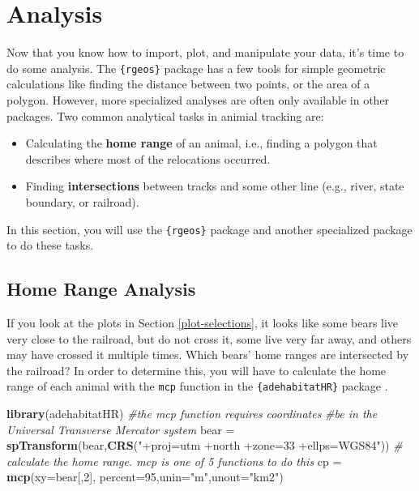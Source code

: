 \documentclass[]{book}
\newenvironment{Shaded}{\begin{snugshade}}{\end{snugshade}}
\newcommand{\KeywordTok}[1]{\textcolor[rgb]{0.13,0.29,0.53}{\textbf{#1}}}
\newcommand{\DataTypeTok}[1]{\textcolor[rgb]{0.13,0.29,0.53}{#1}}
\newcommand{\DecValTok}[1]{\textcolor[rgb]{0.00,0.00,0.81}{#1}}
\newcommand{\StringTok}[1]{\textcolor[rgb]{0.31,0.60,0.02}{#1}}
\newcommand{\CommentTok}[1]{\textcolor[rgb]{0.56,0.35,0.01}{\textit{#1}}}
\newcommand{\NormalTok}[1]{#1}
\providecommand{\tightlist}{%
  \setlength{\itemsep}{0pt}\setlength{\parskip}{0pt}}
\theoremstyle{definition}
\theoremstyle{definition}
\theoremstyle{definition}
\theoremstyle{remark}
\begin{document}
\section{Analysis}\label{Anal}

Now that you know how to import, plot, and manipulate your data, it's
time to do some analysis. The \texttt{\{rgeos\}} package \citep{R-rgeos}
has a few tools for simple geometric calculations like finding the
distance between two points, or the area of a polygon. However, more
specialized analyses are often only available in other packages. Two
common analytical tasks in animial tracking are:

\begin{itemize}
\tightlist
\item
  Calculating the \textbf{home range} of an animal, i.e., finding a
  polygon that describes where most of the relocations occurred.
\item
  Finding \textbf{intersections} between tracks and some other line
  (e.g., river, state boundary, or railroad).
\end{itemize}

In this section, you will use the \texttt{\{rgeos\}} package and another
specialized package to do these tasks.

\subsection{Home Range Analysis}\label{hr-Anal}

If you look at the plots in Section \ref{plot-selections}, it looks like
some bears live very close to the railroad, but do not cross it, some
live very far away, and others may have crossed it multiple times. Which
bears' home ranges are intersected by the railroad? In order to
determine this, you will have to calculate the home range of each animal
with the \texttt{mcp} function in the \texttt{\{adehabitatHR\}} package
\citep{R-adehabitatHR}.

\begin{Shaded}
\begin{Highlighting}[]
\KeywordTok{library}\NormalTok{(adehabitatHR) }
\CommentTok{#the mcp function requires coordinates }
\CommentTok{#be in the Universal Transverse Mercator system}
\NormalTok{bear =}\StringTok{ }\KeywordTok{spTransform}\NormalTok{(bear,}\KeywordTok{CRS}\NormalTok{(}\StringTok{"+proj=utm +north +zone=33 +ellps=WGS84"}\NormalTok{))}
\CommentTok{# calculate the home range. mcp is one of 5 functions to do this}
\NormalTok{cp =}\StringTok{ }\KeywordTok{mcp}\NormalTok{(}\DataTypeTok{xy=}\NormalTok{bear[,}\DecValTok{2}\NormalTok{], }\DataTypeTok{percent=}\DecValTok{95}\NormalTok{,}\DataTypeTok{unin=}\StringTok{"m"}\NormalTok{,}\DataTypeTok{unout=}\StringTok{"km2"}\NormalTok{) }
\end{Highlighting}
\end{Shaded}
\end{document}
